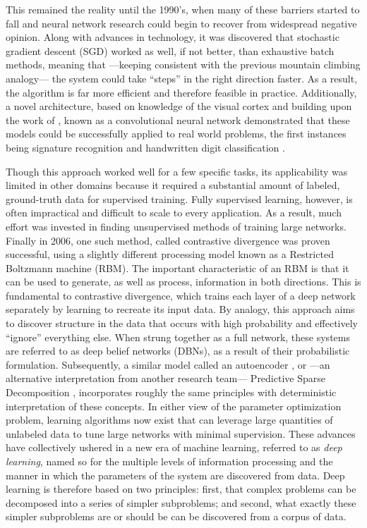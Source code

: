This remained the reality until the 1990's, when many of these barriers started to fall and neural network research could begin to recover from widespread negative opinion.
Along with advances in technology, it was discovered that stochastic gradient descent (SGD) worked as well, if not better, than exhaustive batch methods, meaning that ---keeping consistent with the previous mountain climbing analogy--- the system could take ``steps'' in the right direction faster.
As a result, the algorithm is far more efficient and therefore feasible in practice.
Additionally, a novel architecture, based on knowledge of the visual cortex and building upon the work of \cite{Fukushima1988}, known as a convolutional neural network demonstrated that these models could be successfully applied to real world problems, the first instances being signature recognition \cite{LeCun1994} and handwritten digit classification \cite{LeCun1998}.

Though this approach worked well for a few specific tasks, its applicability was limited in other domains because it required a substantial amount of labeled, ground-truth data for supervised training.
Fully supervised learning, however, is often impractical and difficult to scale to every application.
As a result, much effort was invested in finding unsupervised methods of training large networks.
Finally in 2006, one such method, called contrastive divergence was proven successful, using a slightly different processing model known as a Restricted Boltzmann machine (RBM).
The important characteristic of an RBM is that it can be used to generate, as well as process, information in both directions.
This is fundamental to contrastive divergence, which trains each layer of a deep network separately by learning to recreate its input data.
By analogy, this approach aims to discover structure in the data that occurs with high probability and effectively ``ignore'' everything else.
When strung together as a full network, these systems are referred to as deep belief networks (DBNs), as a result of their probabilistic formulation.
Subsequently, a similar model called an autoencoder \cite{Vincent2010}, or ---an alternative interpretation from another research team--- Predictive Sparse Decomposition \cite{Ranzato2007}, incorporates roughly the same principles with deterministic interpretation of these concepts.
In either view of the parameter optimization problem, learning algorithms now exist that can leverage large quantities of unlabeled data to tune large networks with minimal supervision.
These advances have collectively ushered in a new era of machine learning, referred to as \emph{deep learning}, named so for the multiple levels of information processing and the manner in which the parameters of the system are discovered from data.
Deep learning is therefore based on two principles: first, that complex problems can be decomposed into a series of simpler subproblems; and second, what exactly these simpler subproblems are or should be can be discovered from a corpus of data.

